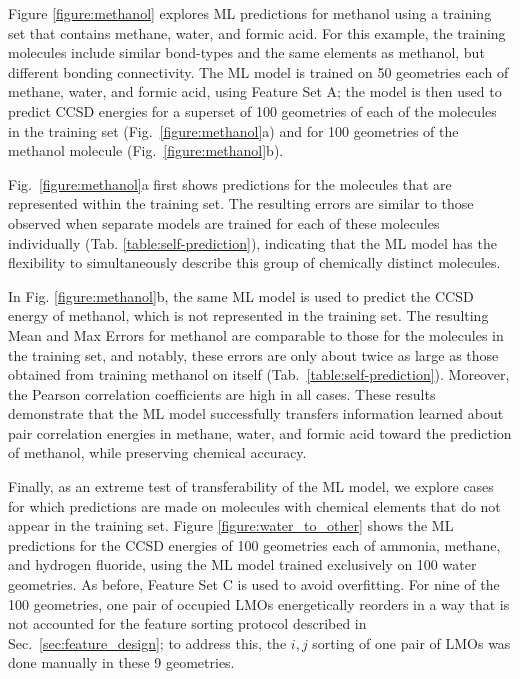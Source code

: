 \documentclass[%
 aps,
 prb,
 twocolumn,
%
 reprint,%
%
citeautoscript,
%
showkeys
]{revtex4-1}
\begin{document}
%
%
Figure  \ref{figure:methanol} explores ML predictions for methanol using a  training set that contains methane, water, and formic acid.  For this example, the  training molecules include similar bond-types and the same elements as methanol, but different bonding connectivity.  The ML model is trained on 50 geometries each of methane, water, and formic acid, using Feature Set A; the model is then used to predict CCSD energies  for a superset 
%
of 100 geometries of each of the molecules in the training set (Fig.~\ref{figure:methanol}a) and for 100 geometries of the methanol molecule (Fig.~\ref{figure:methanol}b). 

%
%
%
%


Fig.~\ref{figure:methanol}a first shows predictions for the molecules that are represented  within the training set.
The resulting errors are similar to those observed when separate models are trained for each of these molecules individually (Tab. \ref{table:self-prediction}), indicating that the ML model has the flexibility to simultaneously describe this group of chemically distinct molecules. 

In Fig. \ref{figure:methanol}b, the same ML model is used to predict the CCSD energy of  methanol, which is not represented in the training set. 
The resulting Mean and Max Errors for methanol are comparable to those for the molecules in the training set, and notably, these errors are only about twice as large as those %
obtained from training methanol on itself (Tab.~\ref{table:self-prediction}). 
Moreover, the Pearson correlation coefficients are high in all cases.
These results demonstrate that the ML model successfully transfers information learned about pair correlation energies in methane, water, and formic acid toward the prediction of methanol, while preserving chemical accuracy.
%
%
%
%
%
%

%

%

%

Finally, as an extreme test of transferability of the ML model,  we explore cases for which predictions are made on molecules with chemical elements that do not appear in the training set. 
Figure \ref{figure:water_to_other} shows the ML predictions for the CCSD energies of  100 geometries each of ammonia, methane, and hydrogen fluoride, using the ML model trained exclusively on 100 water geometries. 
As before, Feature Set C is used to avoid overfitting. 
For nine of the 100  geometries, one pair of occupied LMOs energetically reorders in a way that is not accounted for the feature sorting protocol described in  Sec.~\ref{sec:feature_design}; to address this, the $i,j$ sorting of one pair of LMOs  was done  manually  in these 9  geometries. 
\end{document}

